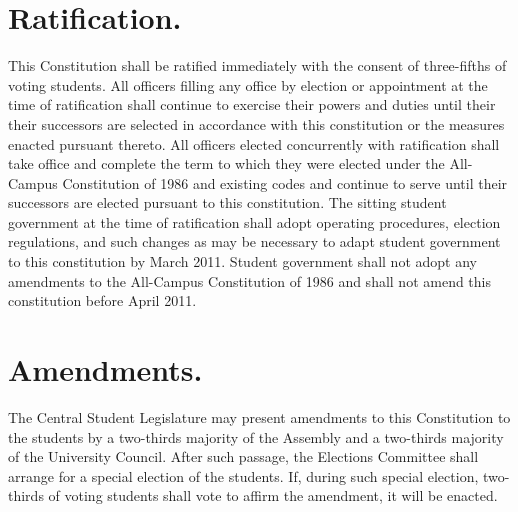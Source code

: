 \section{Ratification.}
    This Constitution shall be ratified immediately with the consent of three-fifths of voting students. All officers filling any office by election or appointment at the time of ratification shall continue to exercise their powers and duties until their their successors are selected in accordance with this constitution or the measures enacted pursuant thereto. All officers elected concurrently with ratification shall take office and complete the term to which they were elected under the All-Campus Constitution of 1986 and existing codes and continue to serve until their successors are elected pursuant to this constitution. The sitting student government at the time of ratification shall adopt operating procedures, election regulations, and such changes as may be necessary to adapt student government to this constitution by March 2011. Student government shall not adopt any amendments to the All-Campus Constitution of 1986 and shall not amend this constitution before April 2011.

\section{Amendments.}
    The Central Student Legislature may present amendments to this Constitution to the students by a two-thirds majority of the Assembly and a two-thirds majority of the University Council. After such passage, the Elections Committee shall arrange for a special election of the students. If, during such special election, two-thirds of voting students shall vote to affirm the amendment, it will be enacted.